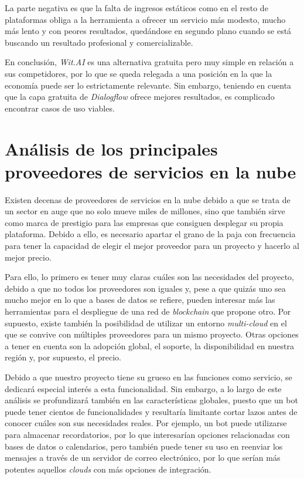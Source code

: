 \documentclass[11pt,spanish,listoffigures]{tfgetsinf}
\begin{document}
La parte negativa es que la falta de ingresos estáticos como en el resto de plataformas obliga a la herramienta a ofrecer un servicio más modesto, mucho más lento y con peores resultados, quedándose en segundo plano cuando se está buscando un resultado profesional y comercializable. 

En conclusión, \textit{Wit.AI} es una alternativa gratuita pero muy simple en relación a sus competidores, por lo que se queda relegada a una posición en la que la economía puede ser lo estrictamente relevante. Sin embargo, teniendo en cuenta que la capa gratuita de \textit{Dialogflow} ofrece mejores resultados, es complicado encontrar casos de uso viables.

\section{Análisis de los principales proveedores de servicios en la nube}
\label{sec:analisis-proveedores-nube}

Existen decenas de proveedores de servicios en la nube debido a que se trata de un sector en auge que no solo mueve miles de millones, sino que también sirve como marca de prestigio para las empresas que consiguen desplegar su propia plataforma. Debido a ello, es necesario apartar el grano de la paja con frecuencia para tener la capacidad de elegir el mejor proveedor para un proyecto y hacerlo al mejor precio. 

Para ello, lo primero es tener muy claras cuáles son las necesidades del proyecto, debido a que no todos los proveedores son iguales y, pese a que quizás uno sea mucho mejor en lo que a bases de datos se refiere, pueden interesar más las herramientas para el despliegue de una red de \textit{blockchain} que propone otro. Por supuesto, existe también la posibilidad de utilizar un entorno \textit{multi-cloud} en el que se convive con múltiples proveedores para un mismo proyecto. Otras opciones a tener en cuenta son la adopción global, el soporte, la \gls{disponibilidad} en nuestra región y, por supuesto, el precio.

Debido a que nuestro proyecto tiene su grueso en las funciones como servicio, se dedicará especial interés a esta funcionalidad. Sin embargo, a lo largo de este análisis se profundizará también en las características globales, puesto que un bot puede tener cientos de funcionalidades y resultaría limitante cortar lazos antes de conocer cuáles son sus necesidades reales. Por ejemplo, un bot puede utilizarse para almacenar recordatorios, por lo que interesarían opciones relacionadas con bases de datos o calendarios, pero también puede tener su uso en reenviar los mensajes a través de un servidor de correo electrónico, por lo que serían más potentes aquellos \textit{clouds} con más opciones de integración. 
\end{document}

